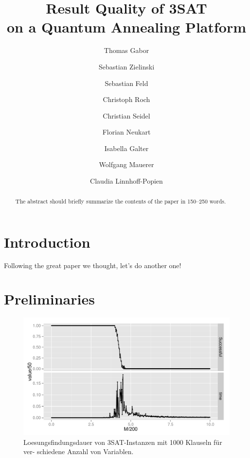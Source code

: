 \documentclass[runningheads]{llncs}
\begin{document}
%
\title{Result Quality of 3SAT\\on a Quantum Annealing Platform}
%
%
\author{Thomas Gabor \and
Sebastian Zielinski \and
Sebastian Feld \and
Christoph Roch \and
Christian Seidel \and
Florian Neukart \and
Isabella Galter \and
Wolfgang Mauerer \and
Claudia Linnhoff-Popien}
%
%
%
\maketitle              %
%
\begin{abstract}
The abstract should briefly summarize the contents of the paper in
150--250 words.

\end{abstract}
%
%
%
\section{Introduction}
Following the great paper \cite{feld2018hybrid} we thought, let's do another one!

\section{Preliminaries}

\begin{figure}
\centering
\includegraphics[width=.8\textwidth]{../material_2/plot_sat.pdf}
\caption{Loesungsfindungsdauer von 3SAT-Instanzen mit 1000 Klauseln für ver- schiedene Anzahl von Variablen.} \label{fig:distr}
\end{figure}
\end{document}
